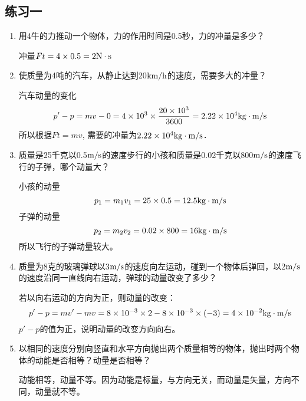 \subsection{练习一}
\begin{enumerate}
    \item 用4牛的力推动一个物体，力的作用时间是0.5秒，力的冲量是多少？

    \begin{solution}
        冲量$Ft=4\times0.5=2{\rm N\cdot s}$
    \end{solution}
    \item 使质量为4吨的汽车，从静止达到20$\text{km}/\text{h}$的速度，需要多大的冲量？

    \begin{solution}
        汽车动量的变化
\[ p'-p=mv-0=4\times10^3\times\frac{20\times10^3}{3600}
        =2.22\times10^4{\rm kg\cdot m/s}\]       
        所以根据$Ft=mv$, 需要的冲量为$2.22\times10^4{\rm kg\cdot m/s}$．
    \end{solution}
    \item 质量是25千克以0.5$\text{m}/\text{s}$的速度步行的小孩和质量是0.02千克以800$\text{m}/\text{s}$的速度飞行的子弹，哪个动量大？

    \begin{solution}
小孩的动量
\[p_1=m_1v_1=25\times0.5=12.5{\rm kg\cdot m/s}\]
子弹的动量
\[p_2=m_2v_2=0.02\times800=16{\rm kg\cdot m/s}\]
所以飞行的子弹动量较大。
    \end{solution}
    \item 质量为8克的玻璃弹球以3$\text{m}/\text{s}$的速度向左运动，碰到一个物体后弹回，以2$\text{m}/\text{s}$的速度沿同一直线向右运动，弹球的动量改变了多少？

    \begin{solution}
        若以向右运动的方向为正，则动量的改变：
       \[ p'-p=mv'-mv=8\times10^{-3}\times2-8\times10^{-3}\times(-3)=4\times10^{-2}{\rm kg\cdot m/s}\]
       $ p'-p$的值为正，说明动量的改变方向向右。
    \end{solution}
    \item 以相同的速度分别向竖直和水平方向抛出两个质量相等的物体，抛出时两个物体的动能是否相等？动量是否相等？

    \begin{solution}
        动能相等，动量不等。因为动能是标量，与方向无关，而动量是矢量，方向不同，动量就不等。
    \end{solution}
\end{enumerate}


